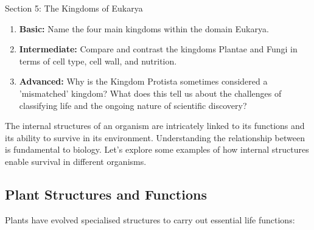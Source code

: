 \begin{tieredquestions}{Section 5: The Kingdoms of Eukarya}
\begin{enumerate}
    \item \textbf{Basic:} Name the four main kingdoms within the domain Eukarya.
    \item \textbf{Intermediate:} Compare and contrast the kingdoms Plantae and Fungi in terms of cell type, cell wall, and nutrition.
    \item \textbf{Advanced:}  Why is the Kingdom Protista sometimes considered a 'mismatched' kingdom? What does this tell us about the challenges of classifying life and the ongoing nature of scientific discovery?
\end{enumerate}
\end{tieredquestions}


\FloatBarrier
\1

The internal structures of an organism are intricately linked to its functions and its ability to survive in its environment.  Understanding the relationship between  is fundamental to biology.  Let's explore some examples of how internal structures enable survival in different organisms.

\subsection{Plant Structures and Functions}

Plants have evolved specialised structures to carry out essential life functions:

